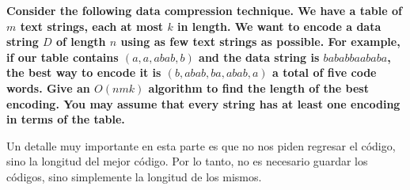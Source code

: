 \textbf{Consider the following data compression technique. We have a table of $m$ text strings, each at most $k$ in length. We want to encode a data string $D$ of length $n$ using as few text strings as possible. For example, if our table contains $(a,a,abab,b)$ and the data string is $bababbaababa$, the best way to encode it is $(b,abab,ba,abab,a)$ a total of five code words. Give an $O(nmk)$ algorithm to find the length of the best encoding. You may assume that every string has at least one encoding in terms of the table.}\vspace{.2cm}

Un detalle muy importante en esta parte es que no nos piden regresar el código, sino la longitud del mejor código. Por lo tanto, no es necesario guardar los códigos, sino simplemente la longitud de los mismos. \vspace{.2cm}

